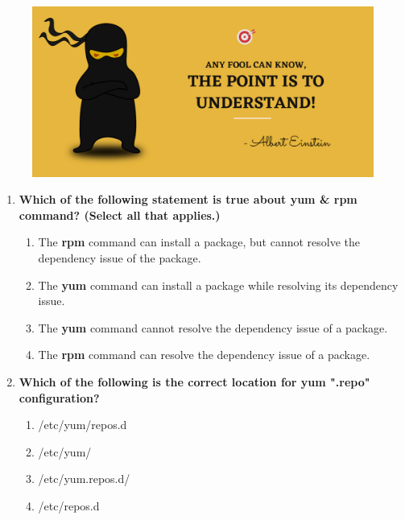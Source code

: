 \setlength{\columnsep}{3pt}
\begin{flushleft}
	
	\paragraph{}
	\bigskip
	
	\begin{figure}[h!]
		\centering
		\includegraphics[scale=.2]{content/practise.jpg}
	\end{figure}	
	\begin{enumerate}
		
		\item \textbf{Which of the following statement is true about yum \& rpm command? (Select all that applies.)}
		\begin{enumerate}[label=(\alph*)]
			\item The \textbf{rpm} command can install a package, but cannot resolve the dependency issue of the package. %
			\item The \textbf{yum} command can install a package while resolving its dependency issue. %
			\item The \textbf{yum} command cannot resolve the dependency issue of a package.
			\item The \textbf{rpm} command can resolve the dependency issue of a package.
		\end{enumerate}
		\bigskip
		\bigskip
		
		\item \textbf{Which of the following is the correct location for yum ".repo" configuration?}
		\begin{enumerate}[label=(\alph*)]
			\item /etc/yum/repos.d
			\item /etc/yum/
			\item /etc/yum.repos.d/  %
			\item /etc/repos.d
		\end{enumerate}
		\bigskip
		\bigskip	
		

\end{enumerate}
\end{flushleft}
